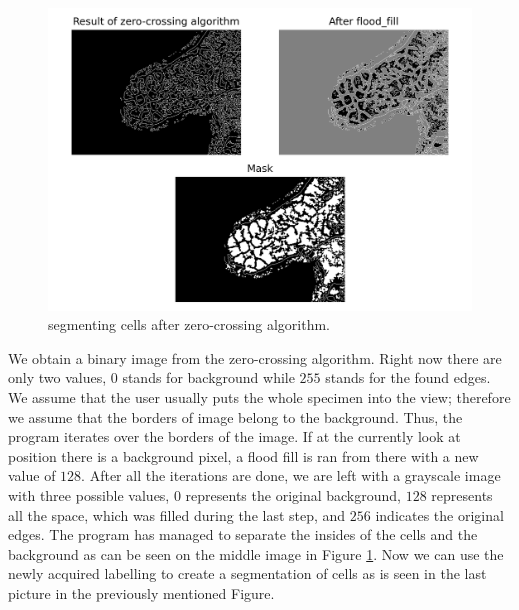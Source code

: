 \documentclass[
  digital,     %
  oneside,     %
  nosansbold,  %
  nocolorbold, %
  lof,         %
  lot,         %
]{fithesis4}
\begin{document}
\begin{figure}
    \begin{center}
        \includegraphics[width=\linewidth]{resources/flood_fill.png}
    \end{center}
    \caption{segmenting cells after zero-crossing algorithm.}
    \label{fig:flood_fill}
\end{figure}

We obtain a binary image from the zero-crossing algorithm. Right now there are
only two values, $0$ stands for background while $255$ stands for the found
edges. We assume that the user usually puts the whole specimen into the view;
therefore we assume that the borders of image belong to the background. Thus,
the program iterates over the borders of the image. If at the currently look at
position there is a background pixel, a flood fill is ran from there with a new
value of $128$. After all the iterations are done, we are left with a grayscale
image with three possible values, $0$ represents the original background, $128$
represents all the space, which was filled during the last step, and $256$
indicates the original edges. The program has managed to separate the insides of
the cells and the background as can be seen on the middle image in Figure
\ref{fig:flood_fill}. Now we can use the newly acquired labelling to create a
segmentation of cells as is seen in the last picture in the previously mentioned
Figure.
\end{document}
